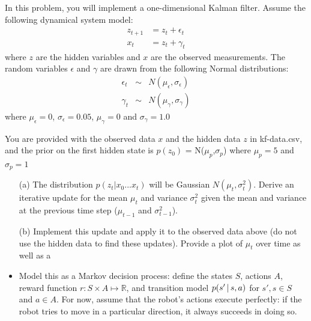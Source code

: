 \documentclass[submit]{harvardml}
\newcommand{\mueps}{\mu_{\epsilon}}
\newcommand{\sigeps}{\sigma_{\epsilon}}
\newcommand{\mugam}{\mu_{\gamma}}
\newcommand{\siggam}{\sigma_{\gamma}}
\newcommand{\muzp}{\mu_{p}}
\newcommand{\sigzp}{\sigma_{p}}
\begin{document}
\begin{problem}
  In this problem, you will implement a one-dimensional Kalman filter.
  Assume the following dynamical system model:
  \begin{eqnarray*}
    z_{t+1} &= z_{t} + \epsilon_{t} \\
    x_{t} & = z_{t} + \gamma_{t}  
  \end{eqnarray*}
  where $z$ are the hidden variables and $x$ are the observed
  measurements.  The random variables $\epsilon$ and $\gamma$ are
  drawn from the following Normal distributions:
  \begin{eqnarray*}
    \epsilon_t &\sim& N(\mueps,\sigeps) \\
    \gamma_t &\sim& N(\mugam,\siggam) 
  \end{eqnarray*}
  where $\mueps = 0$, $\sigeps=0.05$, $\mugam = 0$ and $\siggam=1.0$

  You are provided with the observed data $x$ and the hidden data $z$ in kf-data.csv, and the prior on the first hidden state is $p(z_0)$ = N($\muzp$,$\sigzp$) where $\muzp = 5$ and $\sigzp=1$


    \begin{itemize}
      \item[(a)] The distribution $p(z_t|x_0...x_t)$ will be Gaussian
        $N(\mu_t,\sigma^2_t)$. Derive an iterative update for the mean
        $\mu_t$ and variance $\sigma^2_t$ given the mean and variance
        at the previous time step ($\mu_{t-1}$ and  $\sigma^2_{t-1}$).

       \item[(b)] Implement this update and apply it to the observed data
         above (do not use the hidden data to find these updates). Provide a plot of $\mu_t$ over time as well as a
    \item Model this as a Markov decision process: define the states $S$, actions $A$, reward function $r:S\times A\mapsto \mathbb{R}$, and transition model $p(s'\,|\, s, a)$ for $s', s\in S$ and $a\in A$.  For now, assume that the robot's actions execute perfectly: if the robot tries to move in a particular direction, it always succeeds in doing so.


\end{itemize}
\end{problem}
\end{document}
